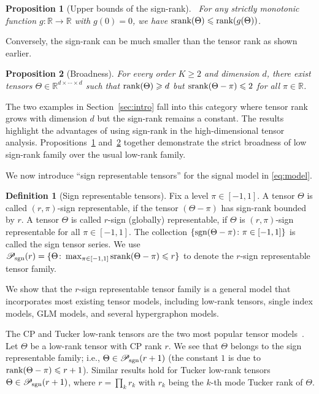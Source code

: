\documentclass[useAMS,usenatbib,usegraphicx,referee]{biom}
\theoremstyle{plain}
\newtheorem{prop}{Proposition}
\theoremstyle{definition}
\newtheorem{defn}{Definition}
\def\sign{\textup{sgn}}
\def\srank{\textup{srank}}
\def\rank{\textup{rank}}
\def\caliP{\mathscr{P}_{\textup{sgn}}}
\begin{document}
\begin{prop}[Upper bounds of the sign-rank]~\label{cor:monotonic} For any strictly monotonic function $g\colon \mathbb{R}\to \mathbb{R}$ with $g(0)=0$, we have $\textup{srank}(\Theta)\leq\rank(g(\Theta))$.
\end{prop}

Conversely, the sign-rank can be much smaller than the tensor rank as shown earlier. 

\begin{prop}[Broadness]\label{prop:extention}\label{cor:broadness}For every order $K\geq 2$ and dimension $d$, there exist tensors $\Theta\in\mathbb{R}^{d\times \cdots \times d}$ such that $\rank(\Theta)\geq d$ but $\srank(\Theta-\pi)\leq 2$ for all $\pi\in\mathbb{R}$.  
\end{prop}
The two examples in Section~\ref{sec:intro} fall into this category where tensor rank grows with dimension $d$ but the sign-rank remains a constant. The results highlight the advantages of using sign-rank in the high-dimensional tensor analysis. Propositions~\ref{cor:monotonic} and~\ref{prop:extention} together demonstrate the strict broadness of low sign-rank family over the usual low-rank family. 

We now introduce  ``sign representable tensors'' for the signal model in \eqref{eq:model}.
\vspace{-.3cm}

\begin{defn}[Sign representable tensors] 
Fix a level $\pi\in[-1,1]$. A tensor $\Theta$ is called $(r,\pi)$-sign representable, if the tensor $(\Theta-\pi)$ has sign-rank bounded by $r$. A tensor $\Theta$ is called $r$-sign (globally) representable, if $\Theta$ is $(r,\pi)$-sign representable for all $\pi\in[-1,1]$. The collection $\{\sign(\Theta-\pi)\colon \pi \in[-1,1]\}$ is called the sign tensor series. 
We use $\caliP(r)=\{\Theta\colon \max_{\pi\in[-1,1]}\srank(\Theta-\pi)\leq r\}$ to denote the $r$-sign representable tensor family.
\end{defn}

We show that the $r$-sign representable tensor family is a general model that incorporates most existing tensor models, including low-rank tensors, single index models, GLM models, and several hypergraphon models. 
\vspace{-.3cm}

\begin{example} The CP and Tucker low-rank tensors are the two most popular tensor models~\citep{kolda2009tensor}. Let $\Theta$ be a low-rank tensor with CP rank $r$. We see that $\Theta$ belongs to the sign representable family; i.e., $\Theta\in\caliP(r+1)$ (the constant $1$ is due to $\rank(\Theta-\pi)\leq r+1$). Similar results hold for Tucker low-rank tensors $\Theta\in\caliP(r+1)$, where $r=\prod_kr_k$ with $r_k$ being the $k$-th mode Tucker rank of $\Theta$.  
\end{example} 
\vspace{-.3cm}
\end{document}
